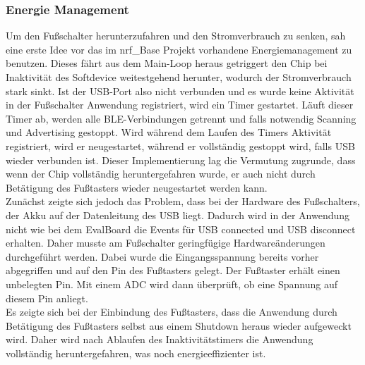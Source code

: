 \subsubsection{Energie Management}
\label{EnergieManagement}
Um den Fußschalter herunterzufahren und den Stromverbrauch zu senken, sah eine erste Idee vor das im nrf\_Base Projekt vorhandene Energiemanagement zu benutzen. Dieses fährt aus dem Main-Loop heraus getriggert den Chip bei Inaktivität des Softdevice weitestgehend herunter, wodurch der Stromverbrauch stark sinkt. Ist der \ac{USB}-Port also nicht verbunden und es wurde keine Aktivität in der Fußschalter Anwendung registriert, wird ein Timer gestartet. Läuft dieser Timer ab, werden alle \ac{BLE}-Verbindungen getrennt und falls notwendig Scanning und Advertising gestoppt. Wird während dem Laufen des Timers Aktivität registriert, wird er neugestartet, während er vollständig gestoppt wird, falls \ac{USB} wieder verbunden ist. Dieser Implementierung lag die Vermutung zugrunde, dass wenn der Chip vollständig heruntergefahren wurde, er auch nicht durch Betätigung des Fußtasters wieder neugestartet werden kann.\\
Zunächst zeigte sich jedoch das Problem, dass bei der Hardware des Fußschalters, der Akku auf der Datenleitung des \ac{USB} liegt. Dadurch wird in der Anwendung nicht wie bei dem EvalBoard die Events für \ac{USB} connected und \ac{USB} disconnect erhalten. Daher musste am Fußschalter geringfügige Hardwareänderungen durchgeführt werden. Dabei wurde die Eingangsspannung bereits vorher abgegriffen und auf den Pin des Fußtasters gelegt. Der Fußtaster erhält einen unbelegten Pin. Mit einem \ac{ADC} wird dann überprüft, ob eine Spannung auf diesem Pin anliegt.\\
Es zeigte sich bei der Einbindung des Fußtasters, dass die Anwendung durch Betätigung des Fußtasters selbst aus einem Shutdown heraus wieder aufgeweckt wird. Daher wird nach Ablaufen des Inaktivitätstimers die Anwendung vollständig heruntergefahren, was noch energieeffizienter ist.

